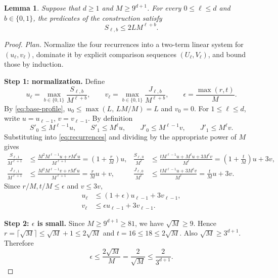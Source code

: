 \documentclass[11pt]{article}
\newtheorem{lemma}[theorem]{Lemma}
\theoremstyle{definition}
\theoremstyle{remark}
\begin{document}
\begin{lemma}
\label{lem:quantitative-profiles}
Suppose that $d\geq 1$ and $M\geq 9^{d+1}$.
For every $0\leq\ell\leq d$ and $b\in\{0,1\}$, the predicates of the
construction satisfy
\[
  S_{\ell,b}\leq 2L M^{\ell+b}.
\]
\end{lemma}

\begin{proof}
\emph{Plan.} Normalize the four recurrences into a two-term linear system for
\((u_\ell,v_\ell)\), dominate it by explicit comparison sequences
\((U_\ell,V_\ell)\), and bound those by induction.

\medskip\noindent\textbf{Step 1: normalization.} Define
\[
 u_\ell=\max_{b\in\{0,1\}}\frac{S_{\ell,b}}{M^{\ell+b}},
 \qquad
 v_\ell=\max_{b\in\{0,1\}}\frac{J_{\ell,b}}{M^{\ell+b}},
 \qquad
 \epsilon=\frac{\max(r,t)}{M}.
\]
By \eqref{eq:base-profile}, \(u_0\le\max(L,\,LM/M)=L\) and \(v_0=0\).
For \(1\le\ell\le d\), write \(u=u_{\ell-1}\), \(v=v_{\ell-1}\). By definition
\[
 S'_0\le M^{\ell-1}u,\qquad S'_1\le M^{\ell}u,\qquad
 J'_0\le M^{\ell-1}v,\qquad J'_1\le M^{\ell}v .
\]
Substituting into \eqref{eq:recurrences} and dividing by the appropriate power
of \(M\) gives
\begin{align*}
 \frac{S_{\ell,1}}{M^{\ell+1}}
   &\leq \frac{M^2M^{\ell-1}u+rM^{\ell}u}{M^{\ell+1}}
    =\left(1+\frac rM\right)u,
 &
 \frac{S_{\ell,0}}{M^\ell}
   &\leq \frac{tM^{\ell-1}u+M^\ell u+3M^\ell v}{M^\ell}
    =\left(1+\frac tM\right)u+3v,\\
 \frac{J_{\ell,1}}{M^{\ell+1}}
   &\leq \frac{M^2M^{\ell-1}v+rM^{\ell}u}{M^{\ell+1}}
    =\frac rM u+v,
 &
 \frac{J_{\ell,0}}{M^\ell}
   &\leq \frac{tM^{\ell-1}u+3M^\ell v}{M^\ell}
    =\frac tM u+3v.
\end{align*}
Since \(r/M,t/M\le\epsilon\) and \(v\le3v\),
\begin{equation}
\label{eq:normalized-recurrences}
 \begin{split}
  u_\ell&\leq (1+\epsilon)u_{\ell-1}+3v_{\ell-1},\\
  v_\ell&\leq \epsilon u_{\ell-1}+3v_{\ell-1}.
 \end{split}
\end{equation}

\noindent\textbf{Step 2: \(\epsilon\) is small.}
Since \(M\ge9^{d+1}\ge81\), we have \(\sqrt M\ge9\). Hence
\(r=\lceil\sqrt M\rceil\le\sqrt M+1\le2\sqrt M\) and
\(t=16\le18\le2\sqrt M\). Also \(\sqrt M\ge3^{d+1}\). Therefore
\begin{equation}
\label{eq:epsilon-choice}
 \epsilon\leq\frac{2\sqrt M}{M}=\frac{2}{\sqrt M}\leq\frac{2}{3^{d+1}}.
\end{equation}


\end{proof}
\end{document}
